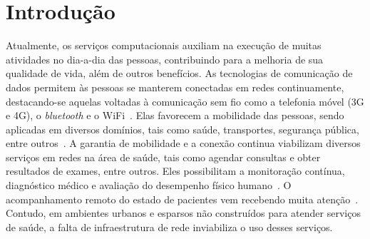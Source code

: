 \documentclass[12pt]{article}
\newcommand{\notered}[1]{\textcolor{red}{{#1}}}
\begin{document}
\section{Introdução} 
\label{sec:intro}

\begin{comment}

1 par. contexto da computação para a sociedade (tecnologia existentes, domínios de aplicações, benefícios à  sociedade)\\
1 par. motivação do Serviço  (escopo técnico - protocolo, serviço) \\
1 par. técnicas existentes na literatura e suas limitações  \\
1 par. sobre formas que poderiam ser aplicadas \\
1 par. Proposta e forma de avaliação  \\
1 par. Estrutura do artigo  \\
\notered{Favor não apagar a estrutura de parágrafos acima. Ela pode ser comentada}
\end{comment}

\begin{comment}
\begin{addmargin}[1.3cm]{1cm}
\textcolor{red}{- \textbf{$1^o$ parágrafo}: Contexto da computação para a sociedade (tecnologia existentes, domínios de aplicações, benefícios à  sociedade)}
\end{addmargin}
\end{comment}

Atualmente, os serviços computacionais auxiliam na execução de muitas atividades no dia-a-dia das pessoas, contribuindo para a melhoria de sua qualidade de vida, além de outros benefícios. As tecnologias de comunicação de dados permitem às pessoas se manterem conectadas em redes continuamente, destacando-se aquelas voltadas à comunicação sem fio como a telefonia móvel (3G e 4G), o \textit{bluetooth} e o WiFi~\cite{aloi2017enabling}. Elas favorecem a mobilidade das pessoas, sendo aplicadas em diversos domínios, tais como saúde, transportes, segurança pública, entre outros~\cite{gharaibeh2017smart}. 
%
A garantia de mobilidade e a conexão continua viabilizam diversos serviços em redes na área de saúde, tais como agendar consultas e obter resultados de exames, entre outros. Eles possibilitam a monitoração contínua, diagnóstico médico e avaliação do desempenho físico humano~\cite{movassaghi2014wireless,health2013thailand}. O acompanhamento remoto do estado de pacientes vem recebendo muita atenção~\cite{gharaibeh2017smart}. Contudo, em ambientes urbanos e esparsos não construídos para atender serviços de saúde, a falta de infraestrutura de rede inviabiliza o uso desses serviços.
\end{document}

